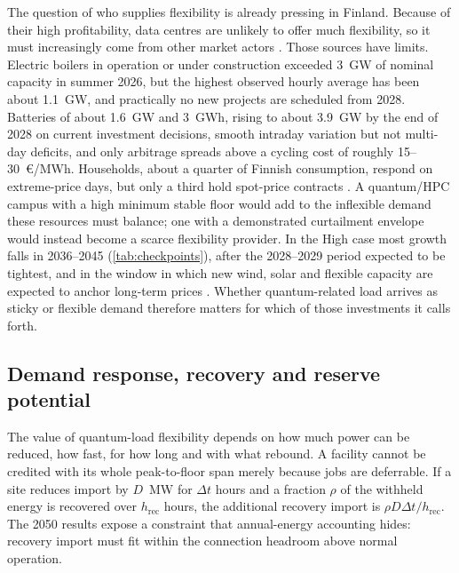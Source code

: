 \documentclass[11pt,a4paper]{article}
\begin{document}
The question of who supplies flexibility is already pressing in Finland. Because of their high profitability, data centres are unlikely to offer much flexibility, so it must increasingly come from other market actors \citep{merilehto2026blog}. Those sources have limits. Electric boilers in operation or under construction exceeded 3~GW of nominal capacity in summer 2026, but the highest observed hourly average has been about 1.1~GW, and practically no new projects are scheduled from 2028. Batteries of about 1.6~GW and 3~GWh, rising to about 3.9~GW by the end of 2028 on current investment decisions, smooth intraday variation but not multi-day deficits, and only arbitrage spreads above a cycling cost of roughly 15--30~\euro/MWh. Households, about a quarter of Finnish consumption, respond on extreme-price days, but only a third hold spot-price contracts \citep{merilehto2026blog}. A quantum/HPC campus with a high minimum stable floor would add to the inflexible demand these resources must balance; one with a demonstrated curtailment envelope would instead become a scarce flexibility provider. In the High case most growth falls in 2036--2045 (\cref{tab:checkpoints}), after the 2028--2029 period expected to be tightest, and in the window in which new wind, solar and flexible capacity are expected to anchor long-term prices \citep{merilehto2026blog}. Whether quantum-related load arrives as sticky or flexible demand therefore matters for which of those investments it calls forth.

\subsection{Demand response, recovery and reserve potential}
The value of quantum-load flexibility depends on how much power can be reduced, how fast, for how long and with what rebound. A facility cannot be credited with its whole peak-to-floor span merely because jobs are deferrable. If a site reduces import by $D$~MW for $\Delta t$ hours and a fraction $\rho$ of the withheld energy is recovered over $h_{\mathrm{rec}}$ hours, the additional recovery import is $\rho D\Delta t/h_{\mathrm{rec}}$. The 2050 results expose a constraint that annual-energy accounting hides: recovery import must fit within the connection headroom above normal operation.
\end{document}
